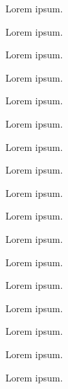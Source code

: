 Lorem ipsum.

 \label{sec:state:redis}

Lorem ipsum.

 \label{sec:state:parse-use-statements}

Lorem ipsum.

 \label{sec:state:redis-active-lock}

Lorem ipsum.

 \label{sec:state:tester-parallel-stress}

Lorem ipsum.

 \label{sec:state:monolog}

Lorem ipsum.

 \label{sec:state:elastic-search}

Lorem ipsum.

 \label{sec:state:doctrine-search}

Lorem ipsum.

 \label{sec:state:geocoder}

Lorem ipsum.

 \label{sec:state:csob-paygate-nette}

Lorem ipsum.

 \label{sec:state:csob-payment-gateway}

Lorem ipsum.

 \label{sec:state:wkhtmltopdf}

Lorem ipsum.

 \label{sec:state:fake-session}

Lorem ipsum.

 \label{sec:state:request-stack}

Lorem ipsum.

 \label{sec:state:strict-objects}

Lorem ipsum.

 \label{sec:state:facebook}

Lorem ipsum.

 \label{sec:state:google}

Lorem ipsum.

